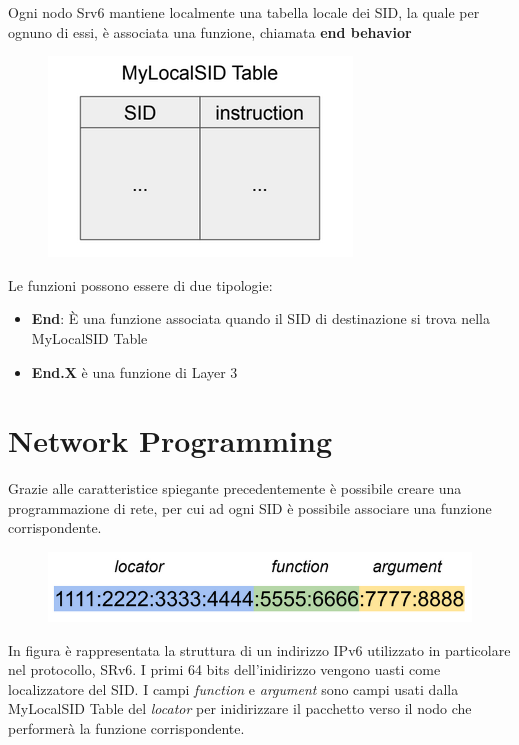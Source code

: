 \documentclass[12pt]{article}
\begin{document}
Ogni nodo Srv6 mantiene localmente una tabella locale dei SID, la quale per ognuno di essi, è associata una 
funzione, chiamata \textbf{end behavior} 

\begin{figure}[h]
    \includegraphics*[scale = 0.5]{F13.png}
    \centering
\end{figure}

Le funzioni possono essere di due tipologie:
\begin{itemize}
    \item \textbf{End}: È una funzione associata quando il SID di destinazione si trova nella MyLocalSID Table
    \item \textbf{End.X} è una funzione di Layer 3
\end{itemize}


\newpage
\section{Network Programming}

Grazie alle caratteristice spiegante precedentemente è possibile creare una programmazione
di rete, per cui ad ogni SID è possibile associare una funzione corrispondente. 

\begin{figure}[h]
    \includegraphics*[scale = 0.5]{F14.png}
    \centering
\end{figure}

In figura è rappresentata la struttura di un indirizzo IPv6 utilizzato in particolare nel protocollo, 
SRv6. I primi 64 bits dell'inidirizzo vengono uasti come localizzatore del SID. I campi 
\textit{function} e \textit{argument} sono campi usati dalla MyLocalSID Table del \textit{locator} per 
inidirizzare il pacchetto verso il nodo che performerà la funzione corrispondente. 
\end{document}
